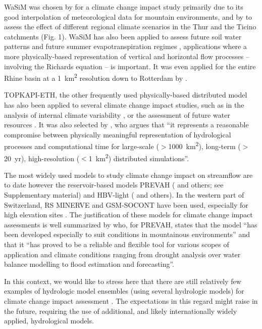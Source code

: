 \documentclass[10pt,a4paper]{article}
\begin{document}
WaSiM was chosen by \citet{Middelkoop2001} for a climate change impact study primarily due to its good interpolation of meteorological data for mountain environments, and by \citet{Jasper2004} to assess the effect of different regional climate scenarios in the Thur and the Ticino catchments (Fig. 1). WaSiM has also been applied to assess future soil water patterns \citep{Jasper2006, Rossler2012} and future summer evapotranspiration regimes \citep{Calanca2006}, applications where a more physically-based representation of vertical and horizontal flow processes -- involving the Richards equation -- is important. It was even applied for the entire Rhine basin at a 1~km\textsuperscript{2} resolution down to Rotterdam by \citet{Kleinn2005}.

TOPKAPI-ETH, the other frequently used physically-based distributed model has also been applied to several climate change impact studies, such as in the analysis of internal climate variability \citep{Fatichi2014}, or the assessment of future water resources \citep{Finger2012}. It was also selected by \citet{Fatichi2015}, who argues that “it represents a reasonable compromise between physically meaningful representation of hydrological processes and computational time for large-scale ($>$1000~km\textsuperscript{2}), long-term ($>$20~yr), high-resolution ($<$1~km\textsuperscript{2}) distributed simulations”.

The most widely used models to study climate change impact on streamflow are to date however the reservoir-based models PREVAH (\citealt{Koplin2012, Speich2015, Milano2015a, Brunner2019c} and others;  see Supplementary material) and HBV-light (\citealt{Etter2017, Hakala2020, Brunner2018a, Jenicek2018}  and others). In the western part of Switzerland, RS MINERVE and GSM-SOCONT have been used, especially for high elevation sites \citep{Horton2006, Uhlmann2013a, Uhlmann2013b, Terrier2015}. The justification of these models for climate change impact assessments is well summarized by \citet{Koplin2010} who, for PREVAH, states that the model ``has been developed especially to suit conditions in mountainous environments'' and that it ``has proved to be a reliable and flexible tool for various scopes of application and climate conditions ranging from drought analysis over water balance modelling to flood estimation and forecasting''. 

In this context, we would like to stress here that there are still relatively few examples of hydrologic model ensembles (using several hydrologic models) for climate change impact assessment \citep{Kobierska2011, Bosshard2013a, Addor2014}. The expectations in this regard might raise in the future, requiring the use of additional, and likely internationally widely applied, hydrological models.
\end{document}
